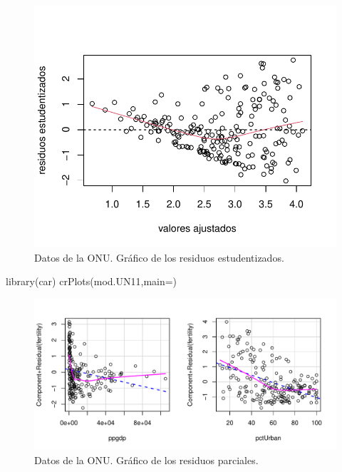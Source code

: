 \documentclass[
]{article}
\newenvironment{Shaded}{\begin{snugshade}}{\end{snugshade}}
\newcommand{\AttributeTok}[1]{\textcolor[rgb]{0.77,0.63,0.00}{#1}}
\newcommand{\FunctionTok}[1]{\textcolor[rgb]{0.00,0.00,0.00}{#1}}
\newcommand{\NormalTok}[1]{#1}
\newcommand{\StringTok}[1]{\textcolor[rgb]{0.31,0.60,0.02}{#1}}
\begin{document}
\begin{figure}

{\centering \includegraphics{MLGI_files/figure-latex/Un11res-1} 

}

\caption{Datos de la ONU. Gráfico de los residuos estudentizados.}\label{fig:Un11res}
\end{figure}

\begin{Shaded}
\begin{Highlighting}[]
\FunctionTok{library}\NormalTok{(car)}
\FunctionTok{crPlots}\NormalTok{(mod.UN11,}\AttributeTok{main=}\StringTok{\textquotesingle{}\textquotesingle{}}\NormalTok{)}
\end{Highlighting}
\end{Shaded}

\begin{figure}

{\centering \includegraphics{MLGI_files/figure-latex/Un11resPartial-1} 

}

\caption{Datos de la ONU. Gráfico de los residuos  parciales.}\label{fig:Un11resPartial}
\end{figure}
\end{document}
